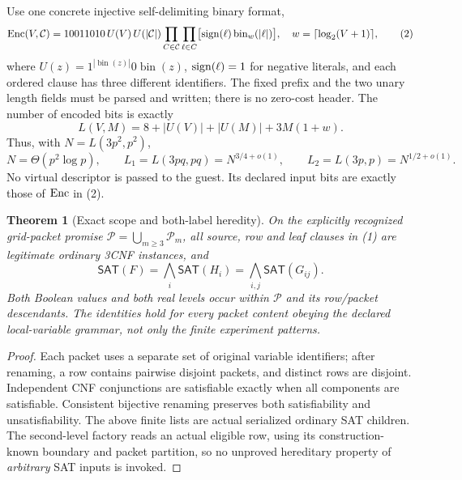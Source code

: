 \documentclass[11pt]{article}
\newtheorem{theorem}{Theorem}
\newcommand{\SAT}{\mathsf{SAT}}
\begin{document}
Use one concrete injective self-delimiting binary format,
\[
 {\rm Enc}(V,\mathcal C)
  =10011010\, U(V)\,U(|\mathcal C|)
   \prod_{C\in\mathcal C}\prod_{\ell\in C}
   \bigl[{\rm sign}(\ell)\,{\rm bin}_{w}(|\ell|)\bigr],
 \quad
 w=\lceil\log_2(V+1)\rceil,
\tag{2}
\]
where \(U(z)=1^{|\operatorname{bin}(z)|}0\operatorname{bin}(z)\),
\({\rm sign}(\ell)=1\) for negative literals, and each ordered clause
has three different identifiers. The fixed prefix and the two unary
length fields must be parsed and written; there is no zero-cost header.
The number of encoded bits is exactly
\[
 L(V,M)=8+|U(V)|+|U(M)|+3M(1+w).
\tag{3}
\]
Thus, with \(N=L(3p^2,p^2)\),
\[
N=\Theta(p^2\log p),\qquad
L_1=L(3pq,pq)=N^{3/4+o(1)},\qquad
L_2=L(3p,p)=N^{1/2+o(1)}.
\tag{4}
\]
No virtual descriptor is passed to the guest. Its declared
input bits are exactly those of \({\rm Enc}\) in (2).

\begin{theorem}[Exact scope and both-label heredity]
On the explicitly recognized grid-packet promise
\(\mathcal P=\bigcup_{m\ge3}\mathcal P_m\), all source, row and
leaf clauses in (1) are legitimate ordinary 3CNF instances, and
\[
 \SAT(F)=\bigwedge_i\SAT(H_i)
 =\bigwedge_{i,j}\SAT(G_{ij}).
\tag{5}
\]
Both Boolean values and both real levels occur within \(\mathcal P\)
and its row/packet descendants. The identities hold for
\emph{every} packet content obeying the declared local-variable
grammar, not only the finite experiment patterns.
\end{theorem}
\begin{proof}
Each packet uses a separate set of original variable identifiers;
after renaming, a row contains pairwise disjoint packets, and
distinct rows are disjoint. Independent CNF conjunctions are
satisfiable exactly when all components are satisfiable.
Consistent bijective renaming preserves both satisfiability and
unsatisfiability. The above finite lists are actual serialized
ordinary SAT children. The second-level factory reads an actual
eligible row, using its construction-known boundary and packet
partition, so no unproved hereditary property of \emph{arbitrary}
SAT inputs is invoked.
\end{proof}
\end{document}

